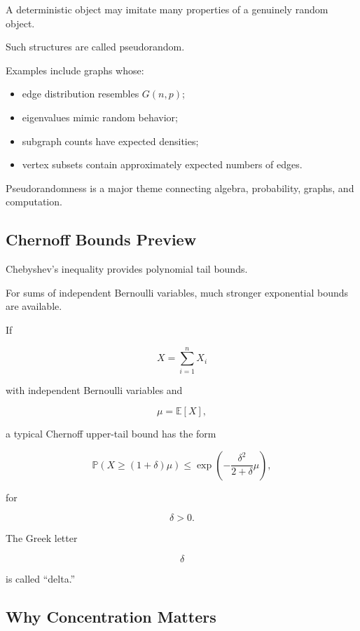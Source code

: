 A deterministic object may imitate many properties of a genuinely
random object.

Such structures are called pseudorandom.

Examples include graphs whose:

\begin{itemize}
    \item edge distribution resembles \(G(n,p)\);
    \item eigenvalues mimic random behavior;
    \item subgraph counts have expected densities;
    \item vertex subsets contain approximately expected numbers of
          edges.
\end{itemize}

Pseudorandomness is a major theme connecting algebra, probability,
graphs, and computation.

\subsection{Chernoff Bounds Preview}
\label{subsec:chernoff-bounds-preview}

Chebyshev's inequality provides polynomial tail bounds.

For sums of independent Bernoulli variables, much stronger exponential
bounds are available.

If

\[
X
=
\sum_{i=1}^{n}X_i
\]

with independent Bernoulli variables and

\[
\mu=\mathbb{E}[X],
\]

a typical Chernoff upper-tail bound has the form

\[
\boxed{
\mathbb{P}
\left(
X\geq(1+\delta)\mu
\right)
\leq
\exp
\left(
-\frac{\delta^2}{2+\delta}\mu
\right),
}
\]

for

\[
\delta>0.
\]

The Greek letter

\[
\delta
\]

is called ``delta.''

\subsection{Why Concentration Matters}
\label{subsec:why-concentration-matters}

